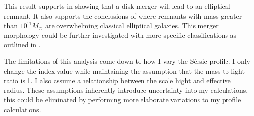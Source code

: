 \documentclass[fleqn,usenatbib]{mnras}
\begin{document}
This result supports \citet{Aceves2006} in showing that a disk merger will lead to an elliptical remnant. It also supports the conclusions of \citet{Hopkins2008} where remnants with mass greater than $10^{11} M_{\odot}$ are overwhelming classical elliptical galaxies. This merger morphology could be further investigated with more specific classifications as outlined in \citet{Masters2025morphology}. 

The limitations of this analysis come down to how I vary the S\'ersic profile. I only change the index value while maintaining the assumption that the mass to light ratio is 1. I also assume a relationship between the scale hight and effective radius. These assumptions inherently introduce uncertainty into my calculations, this could be eliminated by performing more elaborate variations to my profile calculations.  







\bsp	%
\label{lastpage}
\end{document}
